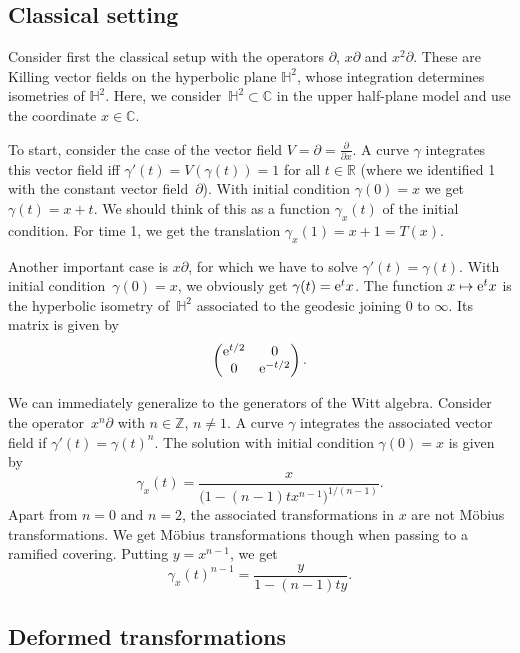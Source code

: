 \documentclass[10pt,a4paper]{amsart}
\numberwithin{equation}{section}
\newcommand*{\R}{\mathbb{R}}
\newcommand*{\C}{\mathbb{C}}
\renewcommand*{\H}{\mathbb{H}}
\begin{document}
\subsection{Classical setting}
Consider first the classical setup with the operators $\partial$, $x\partial$ and $x^2\partial$. These are Killing vector fields on the hyperbolic plane $\H^2$, whose integration determines isometries of $\H^2$. Here, we consider~${\H^2\subset \C}$ in the upper half-plane model and use the coordinate $x\in\C$.

To start, consider the case of the vector field $V=\partial=\tfrac{\partial}{\partial x}$. A curve $\gamma$ integrates this vector field iff $\gamma'(t)=V(\gamma(t))=1$ for all $t\in \R$ (where we identified 1 with the constant vector field~$\partial$). With initial condition $\gamma(0)=x$ we get $\gamma(t)=x+t$. We should think of this as a function $\gamma_x(t)$ of the initial condition. For time 1, we get the translation $\gamma_x(1)=x+1=T(x)$.

Another important case is $x\partial$, for which we have to solve $\gamma'(t)=\gamma(t)$. With initial condition~${\gamma(0)=x}$, we obviously get $\gamma(t)={\rm e}^t x$. The function $x\mapsto {\rm e}^t x$ is the hyperbolic isometry of~$\H^2$ associated to the geodesic joining 0 to $\infty$. Its matrix is given by
\begin{equation}\label{Eq:dilatation}
\begin{pmatrix} {\rm e}^{t/2} & 0 \\ 0 & {\rm e}^{-t/2} \end{pmatrix}.
\end{equation}

We can immediately generalize to the generators of the Witt algebra. Consider the operator~$x^n \partial$ with $n\in \mathbb{Z}$, $n\neq 1$. A curve $\gamma$ integrates the associated vector field if
$\gamma'(t)=\gamma(t)^{n}$. The solution with initial condition $\gamma(0)=x$ is given by
\[
\gamma_x(t)=\frac{x}{\big(1-(n-1)tx^{n-1}\big)^{1/(n-1)}}.
\]
Apart from $n=0$ and $n=2$, the associated transformations in $x$ are not M\"obius transformations. We get M\"obius transformations though when passing to a ramified covering. Putting $y=x^{n-1}$, we get
\[
\gamma_x(t)^{n-1}=\frac{y}{1-(n-1)ty}.
\]


\subsection{Deformed transformations}
\end{document}
